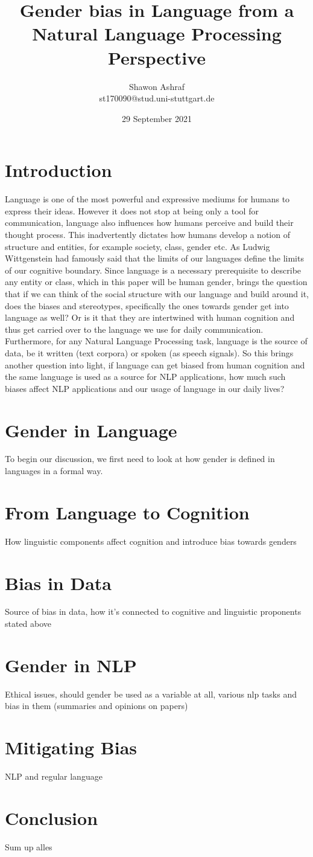 \documentclass{article}
\title{Gender bias in Language from a Natural Language Processing Perspective}
\author{Shawon Ashraf \\ st170090@stud.uni-stuttgart.de}
\date{29 September 2021}
\begin{document}
\section{Introduction}
Language is one of the most powerful and expressive mediums for humans to express their ideas. However it does not stop at being only a tool for communication, language also influences how humans perceive and build their thought process. This inadvertently dictates how humans develop a notion of structure and entities, for example society, class, gender etc. As Ludwig Wittgenstein had famously said that the limits of our languages define the limits of our cognitive boundary. Since language is a necessary prerequisite to describe any entity or class, which in this paper will be human gender, brings the question that if we can think of the social structure with our language and build around it, does the biases and stereotypes, specifically the ones towards gender get into language as well? Or is it that they are intertwined with human cognition and thus get carried over to the language we use for daily communication. Furthermore, for any Natural Language Processing task, language is the source of data, be it written (text corpora) or spoken (as speech signals). So this brings another question into light, if language can get biased from human cognition and the same language is used as a source for NLP applications, how much such biases affect NLP applications and our usage of language in our daily lives?

\section{Gender in Language}
To begin our discussion, we first need to look at how gender is defined in languages in a formal way.

\section{From Language to Cognition}
How linguistic components affect cognition and introduce bias towards genders

\section{Bias in Data}
Source of bias in data, how it's connected to cognitive and linguistic proponents stated above

\section{Gender in NLP}
Ethical issues, should gender be used as a variable at all, various nlp tasks and bias in them (summaries and opinions on papers)

\section{Mitigating Bias}
NLP and regular language

\section{Conclusion}
Sum up alles

\printbibliography
\end{document}
